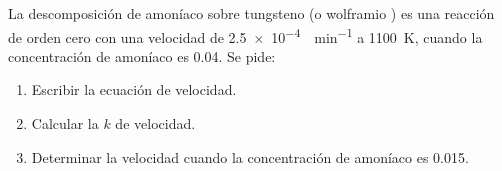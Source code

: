 La descomposición de amoníaco sobre tungsteno (o wolframio ) es una reacción de orden cero con una velocidad de \SI{2,5e-4}{\Molar\per\minute} a \SI{1100}{\kelvin}, cuando la concentración de amoníaco es \SI{0,04}{\Molar}. Se pide:
    \begin{enumerate}[label={\alph*)},font={\color{red!50!black}\bfseries}]
        \item Escribir la ecuación de velocidad. 
        \item Calcular la $k$ de velocidad.
        \item Determinar la velocidad cuando la concentración de amoníaco es \SI{0,015}{\Molar}.
    \end{enumerate}
